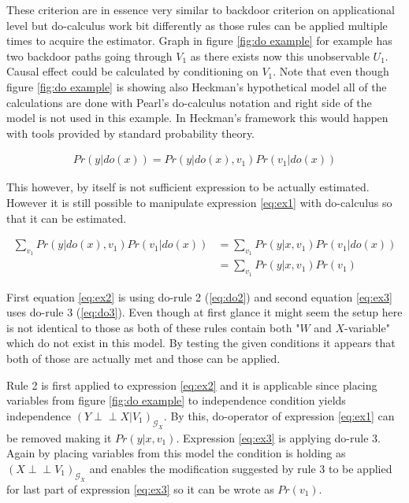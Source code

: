 \documentclass[main=english,12pt,a4paper,pdftex,econ,utf8]{aaltothesis}
\newcommand{\indep}{\perp \!\!\! \perp}
\newcommand{\g}{\mathcal{G}}
\begin{document}
These criterion are in essence very similar to backdoor criterion on applicational level but do-calculus work bit differently as those rules can be applied multiple times to acquire the estimator. Graph in figure \ref{fig:do example} for example has two backdoor paths going through $V_{1}$ as there exists now this unobservable $U_1$. Causal effect could be calculated by conditioning on $V_1$. Note that even though figure \ref{fig:do example} is showing also Heckman's hypothetical model all of the calculations are done with Pearl's do-calculus notation and right side of the model is not used in this example. In Heckman's framework this would happen with tools provided by standard probability theory.



\begin{gather}
    Pr(y|do(x))=Pr(y|do(x),v_1)Pr(v_1|do(x)) \label{eq:ex1}
\end{gather}

\noindent This however, by itself is not sufficient expression to be actually estimated. However it is still possible to manipulate expression \ref{eq:ex1}  with do-calculus so that it can be estimated.

\begin{align}
    \sum_{v_1}Pr(y|do(x), v_1)Pr(v_1|do(x))&=\sum_{v_1}Pr(y|x, v_1)Pr(v_1|do(x)) \label{eq:ex2} \\
    &=\sum_{v_1}Pr(y|x, v_1)Pr(v_1) \label{eq:ex3}
\end{align}

First equation \ref{eq:ex2} is using do-rule 2 (\ref{eq:do2}) and second equation \ref{eq:ex3} uses do-rule 3 (\ref{eq:do3}). Even though at first glance it might seem the setup here is not identical to those as both of these rules contain both "$W$ and $X$-variable" which do not exist in this model. By testing the given conditions it appears that both of those are actually met and those can be applied.

Rule 2 is first applied to expression \ref{eq:ex2} and it is applicable since placing variables from figure \ref{fig:do example} to independence condition yields independence $(Y \indep X|V_{1})_{\g_{\underline{X}}}$. By this, do-operator of expression \ref{eq:ex1} can be removed making it $Pr(y|x,v_1)$. Expression \ref{eq:ex3} is applying do-rule 3. Again by placing variables from this model the condition is holding as $(X\indep V_{1})_{\g_{\overline{X}}}$ and enables the modification suggested by rule 3 to be applied for last part of expression \ref{eq:ex3} so it can be wrote as $Pr(v_{1})$.
\end{document}
